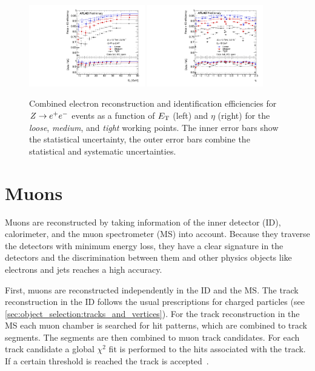 \begin{figure}
    \begin{center}
        \includegraphics[width=0.45\textwidth]{./figures/object_selection/electron_efficiency_et.pdf}
        \includegraphics[width=0.45\textwidth]{./figures/object_selection/electron_efficiency_eta.pdf}
        \caption{Combined electron reconstruction and identification efficiencies for $Z \to e^+e^-$ events as a
                 function of $E_\text{T}$ (left) and $\eta$ (right) for the \emph{loose}, \emph{medium}, and \emph{tight}
                 working points. The inner error bars show the statistical uncertainty, the outer error bars combine
                 the statistical and systematic uncertainties.~\cite{ATLAS-CONF-2016-024}}\label{fig:object_selection:el_id_eff}
    \end{center}
\end{figure}

\section{Muons}\label{sec:object_selection:muons}

Muons are reconstructed by taking information of the inner detector (ID), calorimeter, and the
muon spectrometer (MS) into account.
Because  they traverse the detectors with minimum energy loss, they have a clear signature in the detectors and the
discrimination between them and other physics objects like electrons and jets reaches a high accuracy.

First, muons are reconstructed independently in the ID and the MS\@. The track reconstruction in the ID follows the
usual prescriptions for charged particles (see \cref{sec:object_selection:tracks_and_vertices}).
For the track reconstruction in the MS each muon chamber is searched for hit patterns, which are combined to track
segments. The segments are then combined to muon track candidates. For each track candidate a global $\chi^2$ fit
is performed to the hits associated with the track. If a certain threshold is reached the track is accepted~\cite{PERF-2015-10}.

